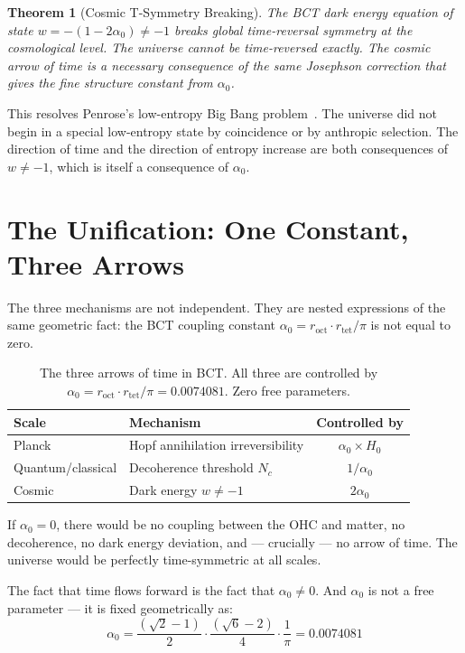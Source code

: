\documentclass[aps,prl,twocolumn,superscriptaddress,floatfix]{revtex4-2}
\newtheorem{theorem}{Theorem}
\newcommand{\roct}{r_{\mathrm{oct}}}
\newcommand{\rtet}{r_{\mathrm{tet}}}
\newcommand{\azero}{\alpha_0}
\newcommand{\Nc}{N_c}
\begin{document}
\begin{theorem}[Cosmic T-Symmetry Breaking]
The BCT dark energy equation of state $w = -(1-2\azero) 
\neq -1$ breaks global time-reversal symmetry at the 
cosmological level. The universe cannot be time-reversed 
exactly. The cosmic arrow of time is a necessary consequence 
of the same Josephson correction that gives the fine 
structure constant from $\azero$.
\end{theorem}

This resolves Penrose's low-entropy Big Bang 
problem~\cite{Penrose1989}. The universe did not begin 
in a special low-entropy state by coincidence or by 
anthropic selection. The direction of time and the 
direction of entropy increase are both consequences 
of $w \neq -1$, which is itself a consequence of $\azero$.

\section{The Unification: One Constant, Three Arrows}

The three mechanisms are not independent. They are 
nested expressions of the same geometric fact: the 
BCT coupling constant $\azero = \roct \cdot \rtet / \pi$ 
is not equal to zero.

\begin{table}[h]
\centering
\begin{tabular}{llc}
\toprule
Scale & Mechanism & Controlled by \\
\midrule
Planck & Hopf annihilation irreversibility & $\azero \times H_0$ \\
Quantum/classical & Decoherence threshold $\Nc$ & $1/\azero$ \\
Cosmic & Dark energy $w \neq -1$ & $2\azero$ \\
\bottomrule
\end{tabular}
\caption{The three arrows of time in BCT. All three are 
controlled by $\azero = \roct \cdot \rtet / \pi = 0.0074081$. 
Zero free parameters.}
\end{table}

If $\azero = 0$, there would be no coupling between the 
OHC and matter, no decoherence, no dark energy deviation, 
and --- crucially --- no arrow of time. The universe would 
be perfectly time-symmetric at all scales.

The fact that time flows forward is the fact that 
$\azero \neq 0$. And $\azero$ is not a free parameter 
--- it is fixed geometrically as:
\begin{equation}
\azero = \frac{(\sqrt{2}-1)}{2} \cdot 
\frac{(\sqrt{6}-2)}{4} \cdot \frac{1}{\pi} = 0.0074081
\end{equation}
\end{document}
